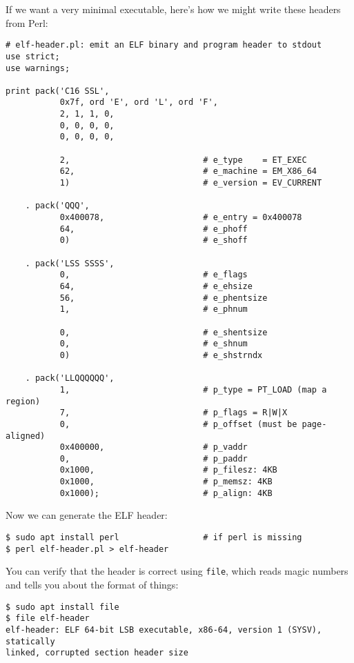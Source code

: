 If we want a very minimal executable, here's how we might write these headers
from Perl:

\begin{verbatim}
# elf-header.pl: emit an ELF binary and program header to stdout
use strict;
use warnings;

print pack('C16 SSL',
           0x7f, ord 'E', ord 'L', ord 'F',
           2, 1, 1, 0,
           0, 0, 0, 0,
           0, 0, 0, 0,

           2,                           # e_type    = ET_EXEC
           62,                          # e_machine = EM_X86_64
           1)                           # e_version = EV_CURRENT

    . pack('QQQ',
           0x400078,                    # e_entry = 0x400078
           64,                          # e_phoff
           0)                           # e_shoff

    . pack('LSS SSSS',
           0,                           # e_flags
           64,                          # e_ehsize
           56,                          # e_phentsize
           1,                           # e_phnum

           0,                           # e_shentsize
           0,                           # e_shnum
           0)                           # e_shstrndx

    . pack('LLQQQQQQ',
           1,                           # p_type = PT_LOAD (map a region)
           7,                           # p_flags = R|W|X
           0,                           # p_offset (must be page-aligned)
           0x400000,                    # p_vaddr
           0,                           # p_paddr
           0x1000,                      # p_filesz: 4KB
           0x1000,                      # p_memsz: 4KB
           0x1000);                     # p_align: 4KB\end{verbatim}

Now we can generate the ELF header:

\begin{verbatim}
$ sudo apt install perl                 # if perl is missing
$ perl elf-header.pl > elf-header\end{verbatim}

You can verify that the header is correct using {\tt file}, which reads magic
numbers and tells you about the format of things:

\begin{verbatim}
$ sudo apt install file
$ file elf-header
elf-header: ELF 64-bit LSB executable, x86-64, version 1 (SYSV), statically
linked, corrupted section header size\end{verbatim}

